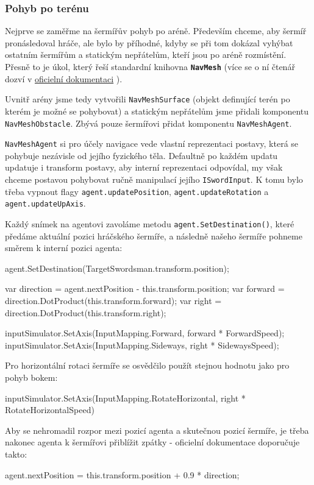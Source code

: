 \subsubsection*{Pohyb po terénu}

Nejprve se zaměřme na šermířův pohyb po aréně. Především chceme, aby šermíř pronásledoval hráče, ale bylo by příhodné, kdyby se při tom dokázal vyhýbat ostatním šermířům a statickým nepřátelům, kteří jsou po aréně rozmístění. Přesně to je úkol, který řeší standardní knihovna \textbf{\texttt{NavMesh}} (více se o ní čtenář dozví v \href{https://docs.unity3d.com/2022.2/Documentation/Manual/Navigation.html}{oficielní dokumentaci} \cite{Unity}).

Uvnitř arény jsme tedy vytvořili \texttt{NavMeshSurface} (objekt definující terén po kterém je možné se pohybovat) a statickým nepřátelům jsme přidali komponentu \texttt{NavMeshObstacle}. Zbývá pouze šermířovi přidat komponentu \texttt{NavMeshAgent}.

\texttt{NavMeshAgent} si pro účely navigace vede vlastní reprezentaci postavy, která se pohybuje nezávisle od jejího fyzického těla. Defaultně po každém updatu updatuje i transform postavy, aby interní reprezentaci odpovídal, my však chceme postavou pohybovat ručně manipulací jejího \texttt{ISwordInput}. K tomu bylo třeba vypnout flagy \texttt{agent.updatePosition}, \texttt{agent.updateRotation} a \texttt{agent.updateUpAxis}. 

Každý snímek na agentovi zavoláme metodu \texttt{agent.SetDestination()}, které předáme aktuální pozici hráčského šermíře, a následně našeho šermíře pohneme směrem k interní pozici agenta:
\begin{code}
 agent.SetDestination(TargetSwordsman.transform.position);

 var direction = agent.nextPosition - this.transform.position;
 var forward = direction.DotProduct(this.transform.forward); 
 var right = direction.DotProduct(this.transform.right);
 
 inputSimulator.SetAxis(InputMapping.Forward, forward * ForwardSpeed);
 inputSimulator.SetAxis(InputMapping.Sideways, right * SidewaysSpeed);
\end{code}
Pro horizontální rotaci šermíře se osvědčilo použít stejnou hodnotu jako pro pohyb bokem:
\begin{code}
 inputSimulator.SetAxis(InputMapping.RotateHorizontal, 
                        right * RotateHorizontalSpeed)
\end{code}
Aby se nehromadil rozpor mezi pozicí agenta a skutečnou pozicí šermíře, je třeba nakonec agenta k šermířovi přiblížit zpátky - oficielní dokumentace doporučuje takto:
\begin{code}
 agent.nextPosition = this.transform.position + 0.9 * direction;
\end{code} 

